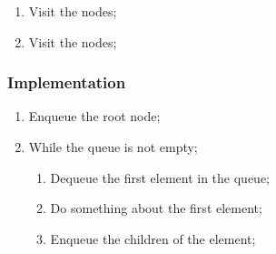   \begin{enumerate}
    \item Visit the  nodes;
    \item Visit the  nodes;
  \end{enumerate}
  
  \subsubsection{Implementation}
  
  \begin{enumerate}
    \item Enqueue the root node;
    \item While the queue is not empty;
    \begin{enumerate}
      \item Dequeue the first element in the queue;
      \item Do something about the first element;
      \item Enqueue the children of the element;
    \end{enumerate}
  \end{enumerate}
